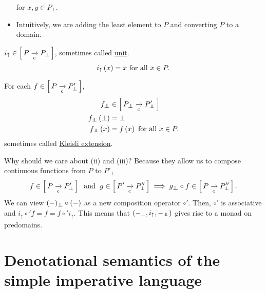 \begin{enumcirc}
\begin{enumrm}
\begin{itemize}
			      for $x, y \in P_\bot$.
			\item
			      Intuitively, we are adding the least element to $P$ and converting $P$ to a
			      domain.
		\end{itemize}
		\item
		$i_\uparrow \in \left[ \, P \xrightarrow[c]{} P_\bot \, \right]$, sometimes called \ul{unit}.
		\[
			i_\uparrow \left( x \right) = x \textrm{ for all } x \in P.
		\]
		\item
		For each $f \in \left[ \, P \xrightarrow[c]{} P'_\bot \, \right]$,
		\begin{align*}
			f_\doublebot              & \in \brackets{P_\doublebot \toc P'_\doublebot} \\
			f_\doublebot \prths{\bot} & = \bot                                         \\
			f_\doublebot \prths{x}    & = f \prths{x} \textrm{ for all } x \in P.
		\end{align*}
		sometimes called \ul{Kleisli extension}.
		\item
		Why should we care about (ii) and (iii)?
		Because they allow us to compose continuous functions from $P$ to $P'_\bot$
		\[
			f \in \left[ \, P \xrightarrow[c]{} P'_\bot \, \right] \; \textrm{ and } \;
			g \in \left[ \, P' \xrightarrow[c]{} P''_\bot \, \right] \implies
			g_{\bot \mkern-11mu \bot} \circ f \in \left[ \, P \xrightarrow[c]{} P''_\bot \, \right].
		\]
		We can view $(-)_{\bot \mkern-11mu \bot} \circ (-)$ as a new composition operator $\circ'$.
		Then, $\circ'$ is associative and $i_\uparrow \circ' f = f = f \circ'
			i_\uparrow$.
		This means that $\left( -_\bot, i_\uparrow, -_{\bot \mkern-11mu \bot} \right)$ gives rise to a
		monad on predomains.
	\end{enumrm}
\end{enumcirc}

\section{Denotational semantics of the simple imperative language}

